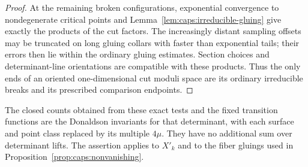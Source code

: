 \begin{proof}
At the remaining broken configurations, exponential convergence to
nondegenerate critical points and
Lemma~\ref{lem:caps:irreducible-gluing} give exactly
the products of the cut factors.  The increasingly distant sampling
offsets may be truncated on long gluing collars with faster than
exponential tails; their errors then lie within the ordinary gluing
estimates.  Section choices and determinant-line orientations are
compatible with these products.  Thus the only ends of an oriented
one-dimensional cut moduli space are its ordinary irreducible breaks
and its prescribed comparison endpoints.
\end{proof}

\begin{lemma}
\label{lem:caps:closed-comparison}
The closed counts obtained from these exact tests and the fixed
transition functions are the Donaldson invariants for that determinant,
with each surface and point class replaced by its multiple $4\mu$.
They have no additional sum over determinant lifts.  The assertion
applies to $X'_k$ and to the fiber gluings used in
Proposition~\ref{prop:caps:nonvanishing}.
\end{lemma}

